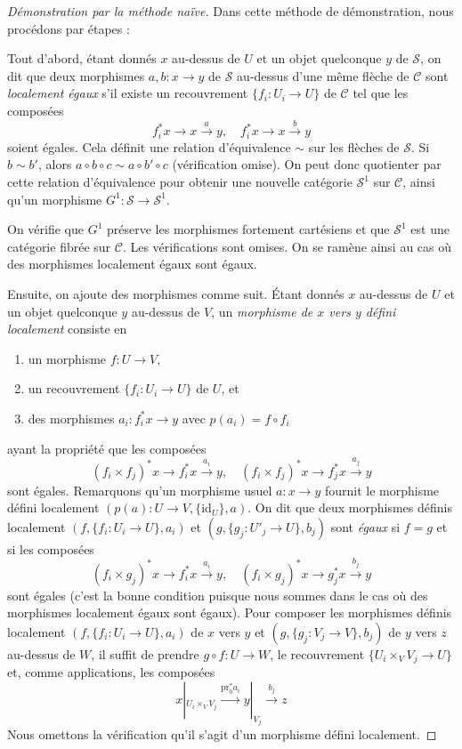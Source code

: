 \begin{proof}[Démonstration par la méthode naïve]
Dans cette méthode de démonstration, nous procédons par étapes :

\medskip\noindent
Tout d'abord, étant donnés $x$ au-dessus de $U$ et un objet quelconque $y$ de
$\mathcal{S}$, on dit que deux morphismes
$a, b : x \to y$ de $\mathcal{S}$
au-dessus d'une même flèche de $\mathcal{C}$
sont {\it localement égaux}
s'il existe un recouvrement $\{f_i : U_i \to U\}$ de $\mathcal{C}$
tel que les composées
$$
f_i^*x \to x \xrightarrow{a} y,
\quad
f_i^*x \to x \xrightarrow{b} y
$$
soient égales. Cela définit une relation d'équivalence $\sim$
sur les flèches de $\mathcal{S}$. Si $b \sim b'$, alors
$a \circ b \circ c \sim a \circ b' \circ c$ (vérification omise).
On peut donc quotienter par cette relation d'équivalence pour
obtenir une nouvelle catégorie $\mathcal{S}^1$ sur $\mathcal{C}$,
ainsi qu'un morphisme $G^1 : \mathcal{S} \to \mathcal{S}^1$.

\medskip\noindent
On vérifie que $G^1$ préserve les morphismes fortement cartésiens
et que $\mathcal{S}^1$ est une catégorie fibrée sur $\mathcal{C}$.
Les vérifications sont omises. On se ramène ainsi au cas où des
morphismes localement égaux sont égaux.

\medskip\noindent
Ensuite, on ajoute des morphismes comme suit. Étant donnés
$x$ au-dessus de $U$ et un objet quelconque $y$ au-dessus de $V$,
un {\it morphisme de $x$ vers $y$ défini localement} consiste en
\begin{enumerate}
\item un morphisme $f : U \to V$,
\item un recouvrement $\{f_i : U_i \to U\}$ de $U$, et
\item des morphismes $a_i : f_i^*x \to y$ avec $p(a_i) = f \circ f_i$
\end{enumerate}
ayant la propriété que les composées
$$
(f_i \times f_j)^*x \to f_i^*x \xrightarrow{a_i} y,
\quad
(f_i \times f_j)^*x \to f_j^*x \xrightarrow{a_j} y
$$
sont égales. Remarquons qu'un morphisme usuel $a : x \to y$ fournit le
morphisme défini localement $(p(a) : U \to V, \{\text{id}_U\}, a)$.
On dit que deux morphismes définis localement
$(f, \{f_i : U_i \to U\}, a_i)$ et $(g, \{g_j : U'_j \to U\}, b_j)$
sont {\it égaux} si $f = g$ et si les composées
$$
(f_i \times g_j)^*x \to f_i^*x \xrightarrow{a_i} y,
\quad
(f_i \times g_j)^*x \to g_j^*x \xrightarrow{b_j} y
$$
sont égales (c'est la bonne condition puisque nous sommes dans le
cas où des morphismes localement égaux sont égaux).
Pour composer les morphismes définis localement
$(f, \{f_i : U_i \to U\}, a_i)$ de $x$ vers $y$ et
$(g, \{g_j : V_j \to V\}, b_j)$ de $y$ vers $z$ au-dessus de $W$,
il suffit de prendre $g \circ f : U \to W$, le recouvrement
$\{U_i \times_V V_j \to U\}$ et, comme applications, les composées
$$
x|_{U_i \times_V V_j}
\xrightarrow{\text{pr}_0^*a_i}
y|_{V_j}
\xrightarrow{b_j}
z
$$
Nous omettons la vérification qu'il s'agit d'un morphisme défini localement.


\end{proof}
